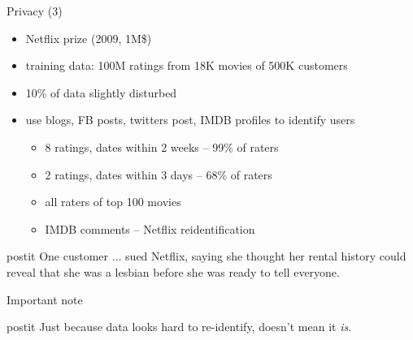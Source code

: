 \documentclass{beamer}
\begin{document}
\begin{frame}{Privacy (3)}
  \begin{itemize}[<+->]
    \item Netflix prize (2009, 1M\$)
    \item training data: 100M ratings from 18K movies of 500K customers
    \item 10\% of data slightly disturbed
    \item use blogs, FB posts, twitters post, IMDB profiles to identify users
      \begin{itemize}
        \item 8 ratings, dates within 2 weeks -- 99\% of raters
        \item 2 ratings, dates within 3 days -- 68\% of raters
        \item all raters of top 100 movies
        \item IMDB comments -- Netflix reidentification
      \end{itemize}
  \end{itemize}
\end{frame}

\begin{frame}{}
\end{frame}

\begin{frame}{}
  \begin{beamercolorbox}[wd=\textwidth,rounded=true,shadow=true]{postit}
    One customer $\ldots$ sued Netflix, saying she thought her rental
    history could reveal that she was a lesbian before she was ready to tell
    everyone.
  \end{beamercolorbox}
\end{frame}

\begin{frame}{}
\end{frame}

\begin{frame}{}
\end{frame}

\begin{frame}{Important note}
  \begin{beamercolorbox}[wd=\textwidth,rounded=true,shadow=true]{postit}
    Just because data looks hard to re-identify, doesn't mean it \textit{is}.
  \end{beamercolorbox}
\end{frame}
\end{document}
